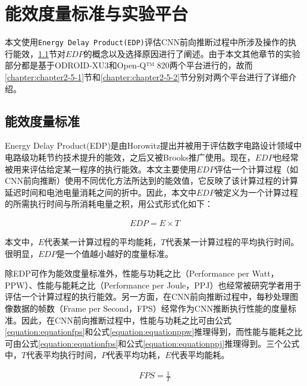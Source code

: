 \section{能效度量标准与实验平台}

本文使用\texttt{Energy Delay Product(EDP)}评估CNN前向推断过程中所涉及操作的执行能效，\ref{chapter:edp}节对$EDP$的概念以及选择原因进行了阐述。由于本文其他章节的实验部分都是基于ODROID-XU3\cite{hardkernel.com}和Open-Q™ 820\cite{intrinsyc.com}两个平台进行的，故而\ref{chapter:chapter2-5-1}节和\ref{chapter:chapter2-5-2}节分别对两个平台进行了详细介绍。

\subsection{能效度量标准}
\label{chapter:edp}

Energy Delay Product(EDP)是由Horowitz\cite{horowitz1994low}提出并被用于评估数字电路设计领域中电路级功耗节约技术提升的能效，之后又被Brooks\cite{brooks2000power}推广使用。现在，$EDP$也经常被用来评估给定某一程序的执行能效。本文主要使用$EDP$评估一个计算过程（如CNN前向推断）使用不同优化方法所达到的能效值，它反映了该计算过程的计算延迟时间和电池电量消耗之间的折中。因此，本文中$EDP$被定义为一个计算过程的所需执行时间与所消耗电量之积，用公式形式化如下：

\begin{equation}
     \label{equation:equation1}
     \begin{aligned}
        EDP = E \times T
     \end{aligned}
\end{equation}

\noindent 本文中，$E$代表某一计算过程的平均能耗，$T$代表某一计算过程的平均执行时间。很明显，$EDP$是一个值越小越好的度量标准。

除EDP可作为能效度量标准外，性能与功耗之比（Performance per Watt，PPW）、性能与能耗之比（Performance per Joule，PPJ）也经常被研究学者用于评估一个计算过程的执行能效。另一方面，在CNN前向推断过程中，每秒处理图像数据的帧数（Frame per Second，FPS\cite{wang2017building}）经常作为CNN推断执行性能的度量标准。因此，在CNN前向推断过程中，性能与功耗之比可由公式\ref{equation:equationfps}和公式\ref{equation:equationppw}推理得到，而性能与能耗之比可由公式\ref{equation:equationfps}和公式\ref{equation:equationppj}推理得到。三个公式中，$T$代表平均执行时间，$P$代表平均功耗，$E$代表平均能耗。

\begin{equation}
     \label{equation:equationfps}
     \begin{aligned}
        FPS = \frac{1}{T}
     \end{aligned}
\end{equation}

